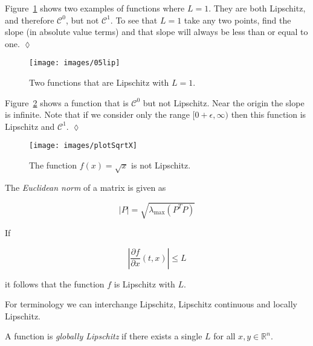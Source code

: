 \begin{example}
Figure~\ref{fig:05lip} shows two examples of functions where $L=1$.
They are both Lipschitz, and therefore $\mathcal{C}^0$, but not $\mathcal{C}^1$.
To see that $L=1$ take any two points, find the slope (in absolute value terms) and that slope will always be less than or equal to one.
$\lozenge$
\end{example}

\begin{figure}[ht!]
\centering
\texttt{[image: images/05lip]}
\caption{Two functions that are Lipschitz with $L=1$.}%
\label{fig:05lip}
\end{figure}

\begin{example}
Figure~\ref{fig:05notlip} shows a function that is $\mathcal{C}^0$ but not Lipschitz.
Near the origin the slope is infinite.
Note that if we consider only the range $[0+\epsilon,\infty)$ then this function is Lipschitz and $\mathcal{C}^1$.%
$\lozenge$
\end{example}

\begin{figure}[ht!]
\centering
\texttt{[image: images/plotSqrtX]}
\caption{The function $f(x) = \sqrt{x}$ is not Lipschitz.}%
\label{fig:05notlip}
\end{figure}

\begin{definition}
The \textit{Euclidean norm} of a matrix is given as

\begin{equation*}
|P| = \sqrt{\lambda_{\text{max}}(P^T P)}
\end{equation*}

\end{definition}

\begin{lemma}
If

\begin{equation*}
\left|\frac{\partial f}{\partial x}(t,x)\right| \leq L
\end{equation*}

it follows that the function $f$ is Lipschitz with $L$.
\end{lemma}
For terminology we can interchange Lipschitz, Lipschitz continuous and locally Lipschitz.

\begin{definition}
A function is \textit{globally Lipschitz} if there exists a single $L$ for all $x,y\in\mathbb{R}^n$.
\end{definition}

